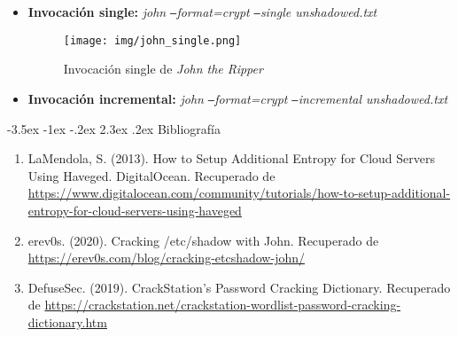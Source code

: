 \documentclass[11pt]{report}
\makeatletter
\renewcommand\chapter{\@startsection{chapter}{0}{\z@}%
    {-3.5ex \@plus -1ex \@minus -.2ex}%
    {2.3ex \@plus.2ex}%
    {\normalfont\Large\bfseries}}
\makeatother
\begin{document}
\begin{itemize}
  \item \textbf{Invocación single:} \emph{john \texttt{--}format=crypt \texttt{--}single unshadowed.txt}
  \begin{figure}[H]
    \centering
    \texttt{[image: img/john\_single.png]}
    \caption{Invocación single de \emph{John the Ripper}}
    \label{fig:invocación single de john the ripper}
  \end{figure}

  \item \textbf{Invocación incremental:} \emph{john \texttt{--}format=crypt \texttt{--}incremental unshadowed.txt}
  

\end{itemize}


\cleardoublepage

\chapter{Bibliografía} %
\begin{enumerate}
\item LaMendola, S. (2013). How to Setup Additional Entropy for Cloud Servers Using Haveged. DigitalOcean. Recuperado de \url{https://www.digitalocean.com/community/tutorials/how-to-setup-additional-entropy-for-cloud-servers-using-haveged}
\item erev0s. (2020). Cracking /etc/shadow with John. Recuperado de \url{https://erev0s.com/blog/cracking-etcshadow-john/}  
\item DefuseSec. (2019). CrackStation's Password Cracking Dictionary. Recuperado de \url{https://crackstation.net/crackstation-wordlist-password-cracking-dictionary.htm}
\end{enumerate}
\end{document}
